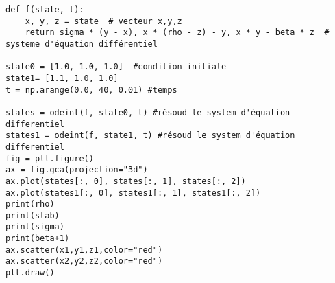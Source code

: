 \begin{appendices}
\begin{verbatim}
def f(state, t):
    x, y, z = state  # vecteur x,y,z
    return sigma * (y - x), x * (rho - z) - y, x * y - beta * z  # systeme d'équation différentiel

state0 = [1.0, 1.0, 1.0]  #condition initiale
state1= [1.1, 1.0, 1.0]
t = np.arange(0.0, 40, 0.01) #temps

states = odeint(f, state0, t) #résoud le system d'équation differentiel
states1 = odeint(f, state1, t) #résoud le system d'équation differentiel
fig = plt.figure()
ax = fig.gca(projection="3d")
ax.plot(states[:, 0], states[:, 1], states[:, 2])
ax.plot(states1[:, 0], states1[:, 1], states1[:, 2])
print(rho)
print(stab)
print(sigma)
print(beta+1)
ax.scatter(x1,y1,z1,color="red")
ax.scatter(x2,y2,z2,color="red")
plt.draw()
\end{verbatim}
\end{appendices}

